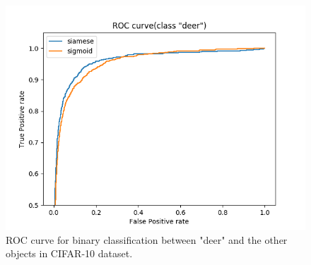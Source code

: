 \documentclass[runningheads,a4paper]{llncs}
\begin{document}
\begin{figure}[ht] 
\centering
\includegraphics[scale=0.5]{roc_curve.png}
\caption{ROC curve for binary classification between "deer" and the other objects in CIFAR-10 dataset.}
\label{fig:roc-bi}
\end{figure}
\end{document}
